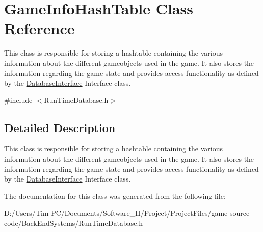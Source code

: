 \hypertarget{class_game_info_hash_table}{}\section{Game\+Info\+Hash\+Table Class Reference}
\label{class_game_info_hash_table}


This class is responsible for storing a hashtable containing the various information about the different gameobjects used in the game. It also stores the information regarding the game state and provides access functionality as defined by the \hyperlink{class_database_interface}{Database\+Interface} Interface class.  




{\ttfamily \#include $<$Run\+Time\+Database.\+h$>$}



\subsection{Detailed Description}
This class is responsible for storing a hashtable containing the various information about the different gameobjects used in the game. It also stores the information regarding the game state and provides access functionality as defined by the \hyperlink{class_database_interface}{Database\+Interface} Interface class. 

The documentation for this class was generated from the following file\+:\begin{DoxyCompactItemize}
\item 
D\+:/\+Users/\+Tim-\/\+P\+C/\+Documents/\+Software\+\_\+\+I\+I/\+Project/\+Project\+Files/game-\/source-\/code/\+Back\+End\+Systems/Run\+Time\+Database.\+h\end{DoxyCompactItemize}

